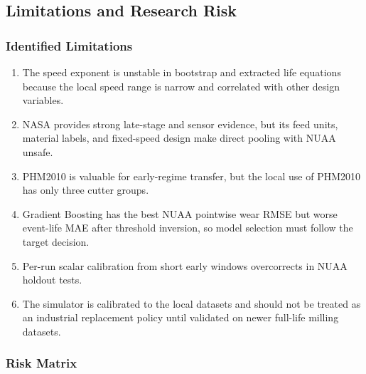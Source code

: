 \documentclass[11pt,a4paper]{article}
\begin{document}
\subsection{Limitations and Research Risk}

\subsubsection{Identified Limitations}

\begin{enumerate}
  \item The speed exponent is unstable in bootstrap and extracted life equations because the local speed range is narrow and correlated with other design variables.
  \item NASA provides strong late-stage and sensor evidence, but its feed units, material labels, and fixed-speed design make direct pooling with NUAA unsafe.
  \item PHM2010 is valuable for early-regime transfer, but the local use of PHM2010 has only three cutter groups.
  \item Gradient Boosting has the best NUAA pointwise wear RMSE but worse event-life MAE after threshold inversion, so model selection must follow the target decision.
  \item Per-run scalar calibration from short early windows overcorrects in NUAA holdout tests.
  \item The simulator is calibrated to the local datasets and should not be treated as an industrial replacement policy until validated on newer full-life milling datasets.
\end{enumerate}

\subsubsection{Risk Matrix}
\end{document}
